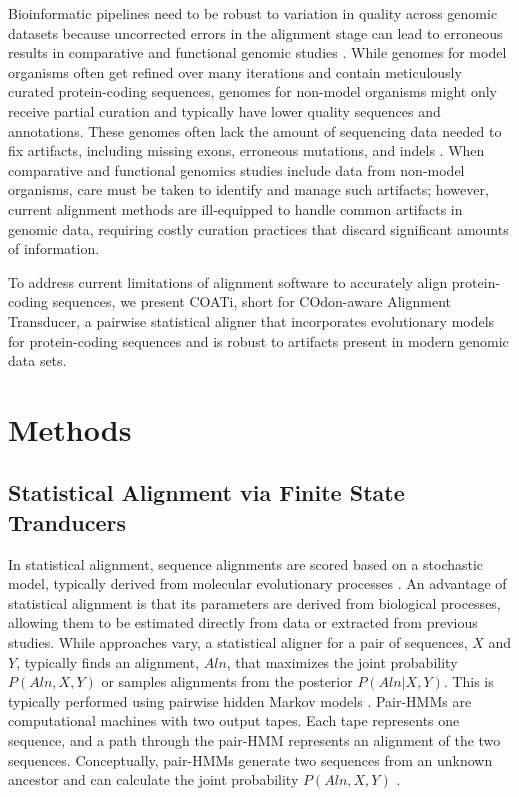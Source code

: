 \documentclass[12pt,letterpaper]{article}
\begin{document}
Bioinformatic pipelines need to be robust to variation in quality across genomic datasets because uncorrected errors in the alignment stage can lead to erroneous results in comparative and functional genomic studies \citep{estimates_schneider_2009, effect_fletcher_2010, hubisz2011error}.
While genomes for model organisms often get refined over many iterations and contain meticulously curated protein-coding sequences, 
genomes for non-model organisms might only receive partial curation and typically have lower quality sequences and annotations.
These genomes often lack the amount of sequencing data needed to fix artifacts, including missing exons, erroneous mutations, and indels \citep{jackman2018tigmint}.
%
When comparative and functional genomics studies include data from non-model organisms, care must be taken to identify and manage such artifacts; however,
current alignment methods are ill-equipped to handle common artifacts in genomic data, requiring costly curation practices that discard significant amounts of information.

To address current limitations of alignment software to accurately align protein-coding sequences, we present COATi, short for COdon-aware Alignment Transducer, a pairwise statistical aligner that incorporates evolutionary models for protein-coding sequences and is robust to artifacts present in modern genomic data sets.


\section*{Methods}

\subsection*{Statistical Alignment via Finite State Tranducers}

In statistical alignment, sequence alignments are scored based on a stochastic model, typically derived from molecular evolutionary processes \citep{Lunter2005-hk}. An advantage of statistical alignment is that its parameters are derived from biological processes, allowing them to be estimated directly from data or extracted from previous studies. While approaches vary, a statistical aligner for a pair of sequences, $X$ and $Y$, typically finds an alignment, $Aln$, that maximizes the joint probability $P(Aln, X, Y)$ or samples alignments from the posterior $P(Aln | X, Y)$. This is typically performed using pairwise hidden Markov models \citep[pair-HMMs;][]{bradley2007transducers}. Pair-HMMs are computational machines with two output tapes. Each tape represents one sequence, and a path through the pair-HMM represents an alignment of the two sequences. Conceptually, pair-HMMs generate two sequences from an unknown ancestor and can calculate the joint probability $P(Aln, X, Y)$ \citep{yoon_2009_hmm}.
\end{document}
